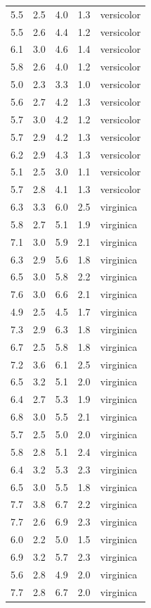 \documentclass[
  letterpaper,
  DIV=11,
  numbers=noendperiod,
  oneside]{scrreprt}
\begin{document}
\begin{longtable}[]{@{}rrrrl@{}}
5.5 & 2.5 & 4.0 & 1.3 & versicolor \\
5.5 & 2.6 & 4.4 & 1.2 & versicolor \\
6.1 & 3.0 & 4.6 & 1.4 & versicolor \\
5.8 & 2.6 & 4.0 & 1.2 & versicolor \\
5.0 & 2.3 & 3.3 & 1.0 & versicolor \\
5.6 & 2.7 & 4.2 & 1.3 & versicolor \\
5.7 & 3.0 & 4.2 & 1.2 & versicolor \\
5.7 & 2.9 & 4.2 & 1.3 & versicolor \\
6.2 & 2.9 & 4.3 & 1.3 & versicolor \\
5.1 & 2.5 & 3.0 & 1.1 & versicolor \\
5.7 & 2.8 & 4.1 & 1.3 & versicolor \\
6.3 & 3.3 & 6.0 & 2.5 & virginica \\
5.8 & 2.7 & 5.1 & 1.9 & virginica \\
7.1 & 3.0 & 5.9 & 2.1 & virginica \\
6.3 & 2.9 & 5.6 & 1.8 & virginica \\
6.5 & 3.0 & 5.8 & 2.2 & virginica \\
7.6 & 3.0 & 6.6 & 2.1 & virginica \\
4.9 & 2.5 & 4.5 & 1.7 & virginica \\
7.3 & 2.9 & 6.3 & 1.8 & virginica \\
6.7 & 2.5 & 5.8 & 1.8 & virginica \\
7.2 & 3.6 & 6.1 & 2.5 & virginica \\
6.5 & 3.2 & 5.1 & 2.0 & virginica \\
6.4 & 2.7 & 5.3 & 1.9 & virginica \\
6.8 & 3.0 & 5.5 & 2.1 & virginica \\
5.7 & 2.5 & 5.0 & 2.0 & virginica \\
5.8 & 2.8 & 5.1 & 2.4 & virginica \\
6.4 & 3.2 & 5.3 & 2.3 & virginica \\
6.5 & 3.0 & 5.5 & 1.8 & virginica \\
7.7 & 3.8 & 6.7 & 2.2 & virginica \\
7.7 & 2.6 & 6.9 & 2.3 & virginica \\
6.0 & 2.2 & 5.0 & 1.5 & virginica \\
6.9 & 3.2 & 5.7 & 2.3 & virginica \\
5.6 & 2.8 & 4.9 & 2.0 & virginica \\
7.7 & 2.8 & 6.7 & 2.0 & virginica \\

\end{longtable}
\end{document}
